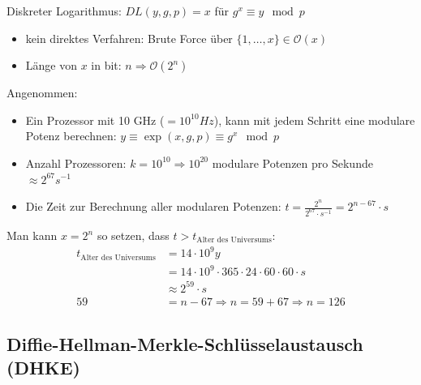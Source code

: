 \documentclass[utf8]{beamer}
\begin{document}
\begin{frame}{\insertsubsectionhead}
  Diskreter Logarithmus: $DL(y, g, p) = x$ für $g^x \equiv y \mod p$
  \begin{itemize}
    \item kein direktes Verfahren: Brute Force über $\{1, \ldots, x\}\in
      \mathcal O(x)$
    \item Länge von $x$ in bit: $n \Rightarrow \mathcal{O}(2^n)$
  \end{itemize}

  Angenommen:
  \begin{itemize}
    \item Ein Prozessor mit 10 GHz ($= 10^{10}Hz$), kann mit jedem Schritt eine
      modulare Potenz berechnen: $y \equiv \exp(x,g,p) \equiv g^x\mod p$
    \item Anzahl Prozessoren: $k=10^{10} \Rightarrow 10^{20}$ modulare Potenzen
      pro Sekunde $\approx 2^{67} s^{-1}$
    \item Die Zeit zur Berechnung aller modularen Potenzen: $t=\frac{2^n}{2^{67}\cdot
      s^{-1}}=2^{n-67}\cdot s$
  \end{itemize}

  Man kann $x=2^n$ so setzen, dass $t>t_{\text{Alter des Universums}}$:
  \begin{align*}
    t_{\text{Alter des Universums}} & = 14 \cdot 10^9y \\
    & = 14 \cdot 10^9 \cdot 365 \cdot 24 \cdot 60\cdot 60\cdot s\\
    & \approx 2^{59}\cdot s\\
    59 & = n-67 \Rightarrow n = 59+67 \Rightarrow n=126
  \end{align*}
\end{frame}

\subsection{Diffie-Hellman-Merkle-Schlüsselaustausch (DHKE)}
\label{sub:diffie_hellman_merkle_schlusselaustausch}
\end{document}
